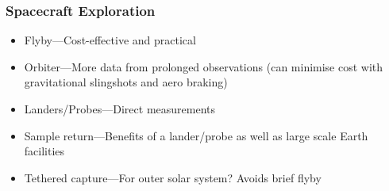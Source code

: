 \documentclass[class=article, crop=false]{standalone}
\begin{document}
  \subsubsection{Spacecraft Exploration}
  \begin{itemize}
    \item Flyby---Cost-effective and practical
    \item Orbiter---More data from prolonged observations (can minimise cost with gravitational slingshots and aero braking)
    \item Landers/Probes---Direct measurements
    \item Sample return---Benefits of a lander/probe as well as large scale Earth facilities
    \item Tethered capture---For outer solar system? Avoids brief flyby
  \end{itemize}
\end{document}
